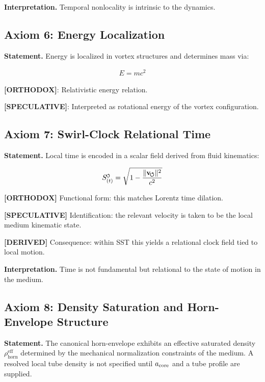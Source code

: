 \documentclass[11pt]{article}
\theoremstyle{definition}
\theoremstyle{plain}
\theoremstyle{remark}
\newcommand{\swirlarrow}{\mathchoice{\mkern-2mu\scriptstyle\boldsymbol{\circlearrowleft}}{\mkern-2mu\scriptstyle\boldsymbol{\circlearrowleft}}{\mkern-2mu\scriptscriptstyle\boldsymbol{\circlearrowleft}}{\mkern-2mu\scriptscriptstyle\boldsymbol{\circlearrowleft}}}
\newcommand{\rhohorn}{\rho_{\mathrm{horn}}^{\mathrm{eff}}}
\newcommand{\SwirlClock}{{S_{(t)}^{\swirlarrow}}}
\newcommand{\vnorm}{\lVert \mathbf{v}_{\!\boldsymbol{\circlearrowleft}} \rVert}
\begin{document}
        \textbf{Interpretation.}
        Temporal nonlocality is intrinsic to the dynamics.
    
    \subsection{Axiom 6: Energy Localization}
        
        \textbf{Statement.}
        Energy is localized in vortex structures and determines mass via:
        
        \begin{align}
            E = m c^2
        \end{align}
        
        \textbf{[ORTHODOX]}: Relativistic energy relation.
        
        \textbf{[SPECULATIVE]}: Interpreted as rotational energy of the vortex configuration.
    
    \subsection{Axiom 7: Swirl-Clock Relational Time}
        
        \textbf{Statement.}
        Local time is encoded in a scalar field derived from fluid kinematics:
        
        \begin{align}
            \SwirlClock = \sqrt{1 - \frac{\vnorm^2}{c^2}}
        \end{align}
        
        \textbf{[ORTHODOX]} Functional form: this matches Lorentz time dilation.

        \textbf{[SPECULATIVE]} Identification: the relevant velocity is taken to be the local medium kinematic state.

        \textbf{[DERIVED]} Consequence: within SST this yields a relational clock field tied to local motion.
        
        \textbf{Interpretation.}
        Time is not fundamental but relational to the state of motion in the medium.
    
    \subsection{Axiom 8: Density Saturation and Horn-Envelope Structure}
        
        \textbf{Statement.}
        The canonical horn-envelope exhibits an effective saturated density
        \(\rhohorn\) determined by the mechanical normalization constraints of the
        medium. A resolved local tube density is not specified until
        \(a_{\rm core}\) and a tube profile are supplied.
        
\end{document}
